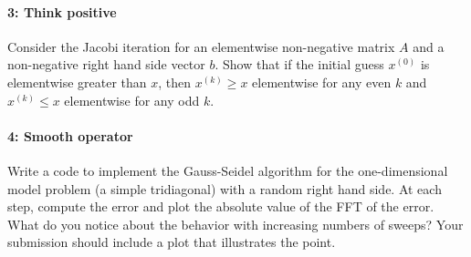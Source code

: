 \documentclass[12pt, leqno]{article} %
\begin{document}
\paragraph*{3: Think positive}
Consider the Jacobi iteration for an elementwise non-negative
matrix $A$ and a non-negative
right hand side vector $b$.  Show that if the initial guess
$x^{(0)}$ is elementwise greater than $x$, then $x^{(k)} \geq x$
elementwise for any even $k$ and $x^{(k)} \leq x$ elementwise for
any odd $k$.

\paragraph*{4: Smooth operator}
Write a code to implement the Gauss-Seidel algorithm for the
one-dimensional model problem (a simple tridiagonal) with a random right
hand side.  At each step, compute the error and plot the absolute value
of the FFT of the error.  What do you notice about the behavior with
increasing numbers of sweeps?  Your submission should include a plot
that illustrates the point.
\end{document}
